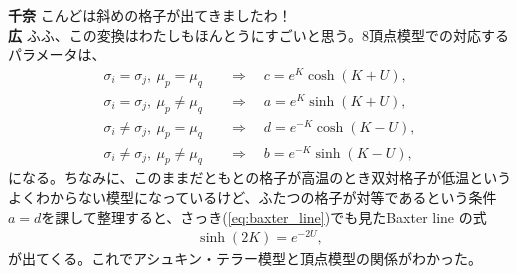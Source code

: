 \documentclass[paper=b5j,fontsize=12Q,jafontsize=12Q,baselineskip=21Q]{jlreq}
\DeclareRobustCommand{\hiron}{\textbf{広 }}
\DeclareRobustCommand{\chinan}{\textbf{千奈 }}
\begin{document}
\begin{refsection}

\chinan こんどは斜めの格子が出てきましたわ！
\\\hiron ふふ、この変換はわたしもほんとうにすごいと思う。8頂点模型での対応するパラメータは、
\begin{align}
  \sigma_i=\sigma_j,\ \mu_p=\mu_q \quad &\Longrightarrow\quad c=e^K\cosh(K+U),\\
  \sigma_i=\sigma_j,\ \mu_p\ne\mu_q \quad &\Longrightarrow\quad a=e^K\sinh(K+U),\\
  \sigma_i\ne\sigma_j,\ \mu_p=\mu_q \quad &\Longrightarrow\quad d=e^{-K}\cosh(K-U),\\
  \sigma_i\ne\sigma_j,\ \mu_p\ne\mu_q \quad &\Longrightarrow\quad b=e^{-K}\sinh(K-U),
\end{align}
になる。ちなみに、このままだともとの格子が高温のとき双対格子が低温というよくわからない模型になっているけど、ふたつの格子が対等であるという条件$a=d$を課して整理すると、さっき(\ref{eq:baxter_line})でも見たBaxter line の式
\begin{align}
  \sinh(2K)=e^{-2U},
\end{align}
が出てくる。これでアシュキン・テラー模型と頂点模型の関係がわかった。


\end{refsection}
\end{document}
